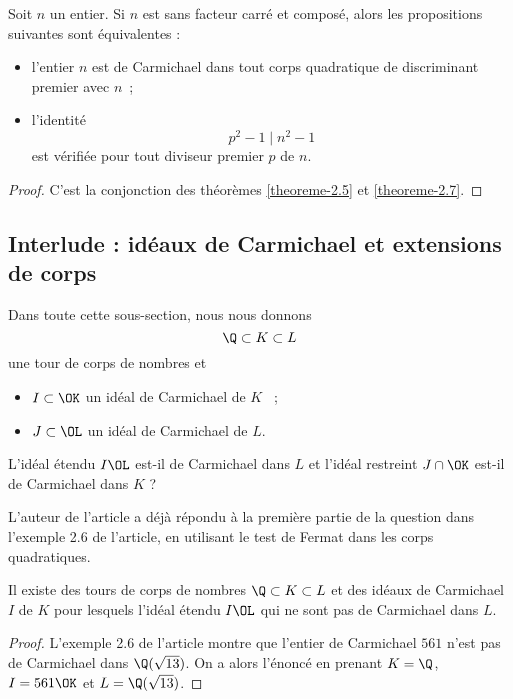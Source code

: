 \begin{theoreme}
	Soit $n$ un entier. Si $n$ est sans facteur carré et composé, alors les propositions suivantes sont équivalentes :
	\begin{itemize}
		\item l'entier $n$ est de Carmichael dans tout corps quadratique de discriminant premier avec $n$~;
		\item l'identité \[p^2 - 1 \mid n^2 - 1\] est vérifiée pour tout diviseur premier $p$ de $n$.
	\end{itemize}
\end{theoreme}

\begin{proof}
	C'est la conjonction des théorèmes \ref{theoreme-2.5} et \ref{theoreme-2.7}.
\end{proof}

\subsection{Interlude : idéaux de Carmichael et extensions de corps}

Dans toute cette sous-section, nous nous donnons $$\Q\subset K \subset L$$ une tour de corps de nombres et
\begin{itemize}
	\item $I\subset \OK$ un idéal de Carmichael de $K$ ~;
	\item $J \subset \OL$ un idéal de Carmichael de $L$.
\end{itemize}

\begin{question}
	L'idéal étendu $I\OL$ est-il de Carmichael dans $L$ et l'idéal restreint $J\cap\OK$ est-il de Carmichael dans $K$ ?
\end{question}

L'auteur de l'article a déjà répondu à la première partie de la question dans l'exemple 2.6 de l'article, en utilisant le test de Fermat dans les corps quadratiques.

\begin{proposition}\label{premier-ce}
	Il existe des tours de corps de nombres $\Q\subset K \subset L$ et des idéaux de Carmichael $I$ de $K$ pour lesquels l'idéal étendu $I\OL$ qui ne sont pas de Carmichael dans $L$.
\end{proposition}

\begin{proof}
	L'exemple 2.6 de l'article montre que l'entier de Carmichael $561$ n'est pas de Carmichael dans $\Q(\sqrt{13})$. On a alors l'énoncé en prenant $K = \Q$, $I = 561\OK$ et $L = \Q(\sqrt{13})$.
\end{proof}

